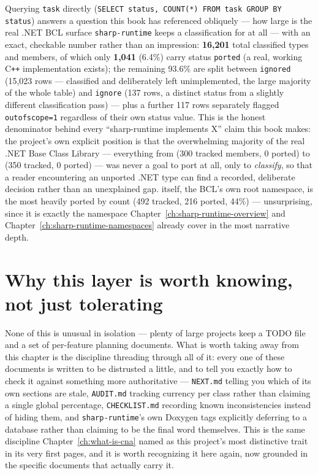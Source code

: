 Querying \texttt{task} directly (\texttt{SELECT status, COUNT(*) FROM task GROUP BY status})
answers a question this book has referenced obliquely --- how large is the real .NET BCL
surface \texttt{sharp-runtime} keeps a classification for at all --- with an exact, checkable
number rather than an impression: \textbf{16{,}201} total classified types and members, of
which only \textbf{1{,}041} (6.4\%) carry status \texttt{ported} (a real, working C\texttt{++}
implementation exists); the remaining 93.6\% are split between \texttt{ignored} (15{,}023 rows
--- classified and deliberately left unimplemented, the large majority of the whole table) and
\texttt{ignore} (137 rows, a distinct status from a slightly different classification pass) ---
plus a further 117 rows separately flagged \texttt{outofscope=1} regardless of their own status
value. This is the honest denominator behind every ``sharp-runtime implements X'' claim this
book makes: the project's own explicit position is that the overwhelming majority of the real
.NET Base Class Library --- everything from  (300 tracked members, 0
ported) to  (350 tracked, 0 ported) --- was never a goal to port
at all, only to \emph{classify}, so that a reader encountering an unported .NET type can find a
recorded, deliberate decision rather than an unexplained gap.  itself, the
BCL's own root namespace, is the most heavily ported by count (492 tracked, 216 ported,
44\%) --- unsurprising, since it is exactly the namespace Chapter~\ref{ch:sharp-runtime-overview}
and Chapter~\ref{ch:sharp-runtime-namespaces} already cover in the most narrative depth.

\section{Why this layer is worth knowing, not just tolerating}

None of this is unusual in isolation --- plenty of large projects keep a TODO file and a set
of per-feature planning documents. What is worth taking away from this chapter is the
discipline threading through all of it: every one of these documents is written to be
distrusted a little, and to tell you exactly how to check it against something more
authoritative --- \texttt{NEXT.md} telling you which of its own sections are stale,
\texttt{AUDIT.md} tracking currency per class rather than claiming a single global percentage,
\texttt{CHECKLIST.md} recording known inconsistencies instead of hiding them, and
\texttt{sharp-runtime}'s own Doxygen tags explicitly deferring to a database rather than
claiming to be the final word themselves. This is the same discipline
Chapter~\ref{ch:what-is-cna} named as this project's most distinctive trait in its very first
pages, and it is worth recognizing it here again, now grounded in the specific documents that
actually carry it.
